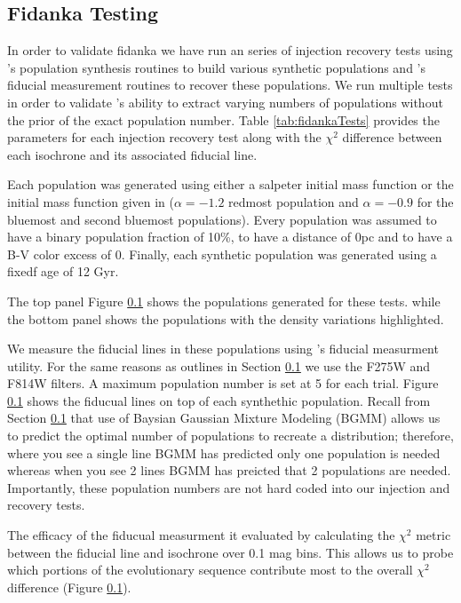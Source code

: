 \subsection{Fidanka Testing}
In order to validate fidanka we have run an series of injection recovery tests
using \fidanka's population synthesis routines to build various synthetic
populations and \fidanka's fiducial measurement routines to recover these
populations. We run multiple tests in order to validate \fidanka's ability to
extract varying numbers of populations without the prior of the exact population
number. Table \ref{tab:fidankaTests} provides the parameters for each injection recovery
test along with the $\chi^{2}$ difference between each isochrone and its associated fiducial line.

Each population was generated using either a salpeter initial mass function \citep{Salpeter1955} or the initial mass function given in \citep{Milone2012} ($\alpha=-1.2$ redmost population and $\alpha=-0.9$ for the bluemost and second bluemost populations). Every population was assumed to have a binary population fraction of 10\%, to have a distance of 0pc and to have a B-V color excess of 0. Finally, each synthetic population was generated using a fixedf age of 12 Gyr.

\begin{table}
\end{table}

The top panel Figure \ref{} shows the populations generated for these tests. while the bottom panel shows the populations with the density variations highlighted. 

We measure the fiducial lines in these populations using \fidanka's fiducial measurment utility. For the same
reasons as outlines in Section \ref{} we use the F275W and F814W filters. A maximum population number is set at 5 for each trial. Figure \ref{} shows the fiducual lines on top of each synthethic population. Recall from Section \ref{} that use of Baysian Gaussian Mixture Modeling (BGMM) allows us to predict the optimal number of populations to recreate a distribution; therefore, where you see a single line BGMM has predicted only one population is needed whereas when you see 2 lines BGMM has preicted that 2 populations are needed. Importantly, these population numbers are not hard coded into our injection and recovery tests.

The efficacy of the fiducual measurment it evaluated by calculating the $\chi^{2}$ metric between the fiducial line and isochrone over 0.1 mag bins. This allows us to probe which portions of the evolutionary sequence contribute most to the overall $\chi^{2}$ difference (Figure \ref{}).
